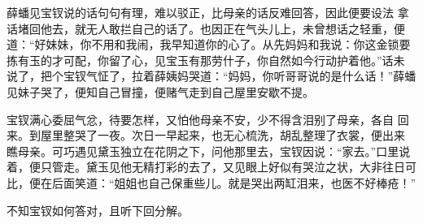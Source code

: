 薛蟠见宝钗说的话句句有理，难以驳正，比母亲的话反难回答，因此便要设法
拿话堵回他去，就无人敢拦自己的话了。也因正在气头儿上，未曾想话之轻重，便
道：“好妹妹，你不用和我闹，我早知道你的心了。从先妈妈和我说：你这金锁要
拣有玉的才可配，你留了心，见宝玉有那劳什子，你自然如今行动护着他。”话未
说了，把个宝钗气怔了，拉着薛姨妈哭道：“妈妈，你听哥哥说的是什么话！”薛蟠
见妹子哭了，便知自己冒撞，便赌气走到自己屋里安歇不提。

宝钗满心委屈气忿，待要怎样，又怕他母亲不安，少不得含泪别了母亲，各自
回来。到屋里整哭了一夜。次日一早起来，也无心梳洗，胡乱整理了衣裳，便出来
瞧母亲。可巧遇见黛玉独立在花阴之下，问他那里去，宝钗因说：“家去。”口里说
着，便只管走。黛玉见他无精打彩的去了，又见眼上好似有哭泣之状，大非往日可
比，便在后面笑道：“姐姐也自己保重些儿。就是哭出两缸泪来，也医不好棒疮！”

不知宝钗如何答对，且听下回分解。